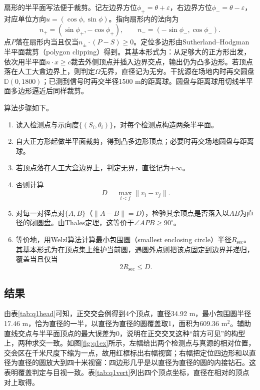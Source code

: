 \documentclass{cumcmthesis}
\begin{document}
扇形的半平面写法便于裁剪。记左边界方位$\phi_+=\theta+\varepsilon$，右边界方位$\phi_-=\theta-\varepsilon$，对应单位方向$u=(\cos\phi,\sin\phi)$。指向扇形内的法向为
\begin{equation}
n_+=(\sin\phi_+,-\cos\phi_+),\qquad n_-=(-\sin\phi_-,\cos\phi_-).
\label{eq:normals}
\end{equation}
点$P$落在扇形内当且仅当$n_\pm\cdot(P-S)\ge 0$。定位多边形由Sutherland--Hodgman半平面裁剪（polygon clipping）得到。其基本形式为：从足够大的正方形出发，依次用半平面$n\cdot x\ge c$裁去外侧顶点并插入边界交点，输出仍为凸多边形\cite{sutherland1974}。若顶点落在人工大盒边界上，则判定$\Omega$无界，直径记为无穷。干扰源在场地内时再交圆盘$\mathbb{D}(0,1800)$；已测到信号时再交半径1500 m的距离球。圆盘与距离球用切线半平面多边形逼近后同样裁剪。

算法步骤如下。

\begin{enumerate}
\item 读入检测点与示向度$\{(S_i,\theta_i)\}$，对每个检测点构造两条半平面。
\item 自大正方形起做半平面裁剪，得到凸多边形顶点；必要时再交场地圆盘与距离球。
\item 若顶点落在人工大盒边界上，判定无界，直径记为$+\infty$。
\item 否则计算
\begin{equation}
D=\max_{i<j}\|v_i-v_j\|.
\label{eq:dvert}
\end{equation}
\item 对每一对径点对$\{A,B\}$（$\|A-B\|=D$），检验其余顶点是否落入以$AB$为直径的闭圆盘。由Thales定理，这等价于$\angle APB\ge 90^\circ$。
\item 等价地，用Welzl算法计算最小包围圆（smallest enclosing circle）半径$R_{\mathrm{sec}}$\cite{welzl1991}。其基本形式为在顶点集上维护当前圆，遇圆外点则把该点固定到边界并递归，覆盖当且仅当
\begin{equation}
2R_{\mathrm{sec}}\le D.
\label{eq:cover}
\end{equation}
\end{enumerate}

\subsection{结果}

由表\ref{tab:q1head}可知，正交交会例得到4个顶点，直径34.92 m，最小包围圆半径17.46 m，恰为直径的一半，以直径为直径的圆覆盖取1，面积为609.36 m$^2$。辅助直线交点与半平面顶点的最大误差为0，说明在正交交叉这种“前方可见”的构型上，两种求交一致。如图\ref{fig:q1ex}所示，左幅给出两个检测点与真源的相对位置，交会区在千米尺度下缩为一点，故用红框标出右幅视窗；右幅把定位四边形和以直径为直径的圆放大到四十米视窗：四边形几乎是以直径为直径的圆的内接钻石。这表明覆盖判定与目视一致。表\ref{tab:q1vert}列出四个顶点坐标，直径在相对的顶点对上取得。
\end{document}
